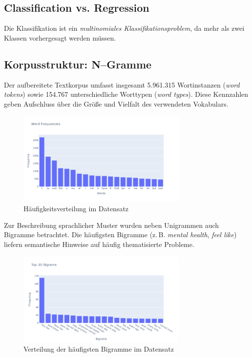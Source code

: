 \subsection{Classification vs. Regression}
Die Klassifikation ist ein \textit{multinomiales Klassifikationsproblem}, da mehr als zwei Klassen vorhergesagt werden müssen.

\subsection{Korpusstruktur: N–Gramme}
Der aufbereitete Textkorpus umfasst insgesamt 5.961.315 Wortinstanzen (\textit{word tokens}) sowie 154.767 unterschiedliche Worttypen (\textit{word types}). Diese Kennzahlen geben Aufschluss über die Größe und Vielfalt des verwendeten Vokabulars.

\begin{figure}[h]
    \centering
    \includegraphics[width=0.75\textwidth]{images/word_frequencies.png}
    \caption{Häufigkeitsverteilung im Datensatz}
    \label{fig:wordfreq}
\end{figure}

Zur Beschreibung sprachlicher Muster wurden neben Unigrammen auch Bigramme betrachtet. Die häufigsten Bigramme (z.\,B. \textit{mental health}, \textit{feel like}) liefern semantische Hinweise auf häufig thematisierte Probleme.

\begin{figure}[h]
    \centering
    \includegraphics[width=0.75\textwidth]{images/bigrams.png}
    \caption{Verteilung der häufigsten Bigramme im Datensatz}
    \label{fig:bigrams}
\end{figure}

